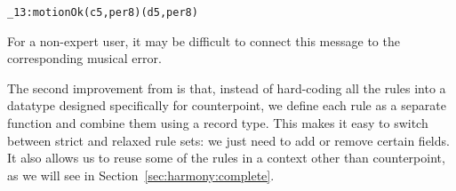 \begin{alltt}
\_13 : motionOk (c 5 , per8) (d 5 , per8)
\end{alltt}

\noindent For a non-expert user, it may be difficult to connect
this message to the corresponding musical error.

The second improvement from \citet{cong-cp} is that, instead of
hard-coding all the rules into a datatype designed specifically for
counterpoint, we define each rule as a separate function and
combine them using a record type.
This makes it easy to switch between strict and relaxed rule sets:
we just need to add or remove certain fields.
It also allows us to reuse some of the rules in a context other than
counterpoint, as we will see in Section~\ref{sec:harmony:complete}.